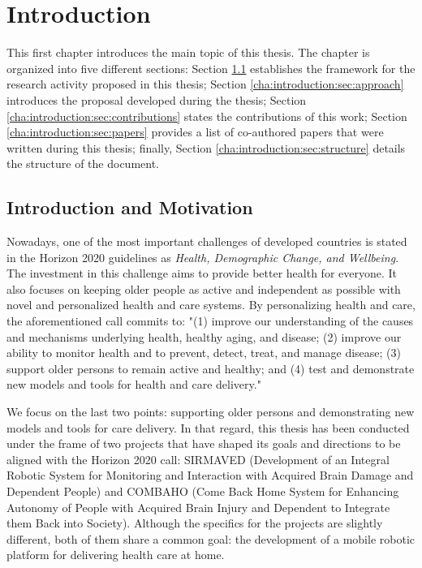 \chapter{Introduction}
\label{cha:introduction}

\begin{chapterabstract}
This first chapter introduces the main topic of this thesis. The chapter is organized into five different sections: Section \ref{cha:introduction:sec:motivation} establishes the framework for the research activity proposed in this thesis; Section \ref{cha:introduction:sec:approach} introduces the proposal developed during the thesis; Section \ref{cha:introduction:sec:contributions} states the contributions of this work; Section \ref{cha:introduction:sec:papers} provides a list of co-authored papers that were written during this thesis; finally, Section \ref{cha:introduction:sec:structure} details the structure of the document.
\end{chapterabstract}

\minitoc

\clearpage

\section{Introduction and Motivation}
\label{cha:introduction:sec:motivation}

Nowadays, one of the most important challenges of developed countries is stated in the Horizon 2020 guidelines as \emph{Health, Demographic Change, and Wellbeing}. The investment in this challenge aims to provide better health for everyone. It also focuses on keeping older people as active and independent as possible with novel and personalized health and care systems. By personalizing health and care, the aforementioned call commits to: "(1) improve our understanding of the causes and mechanisms underlying health, healthy aging, and disease; (2) improve our ability to monitor health and to prevent, detect, treat, and manage disease; (3) support older persons to remain active and healthy; and (4) test and demonstrate new models and tools for health and care delivery."

We focus on the last two points: supporting older persons and demonstrating new models and tools for care delivery. In that regard, this thesis has been conducted under the frame of two projects that have shaped its goals and directions to be aligned with the Horizon 2020 call: SIRMAVED (Development of an Integral Robotic System for Monitoring and Interaction with Acquired Brain Damage and Dependent People) and COMBAHO (Come Back Home System for Enhancing Autonomy of People with Acquired Brain Injury and Dependent to Integrate them Back into Society). Although the specifics for the projects are slightly different, both of them share a common goal: the development of a mobile robotic platform for delivering health care at home.

